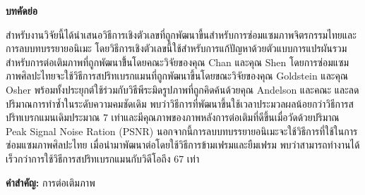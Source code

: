 \thispagestyle{empty}
\vspace{2 cm}
{\huge \bf บทคัดย่อ}

\vspace{2 cm}

\hspace{1cm} สำหรับงานวิจัยนี้ได้นำเสนอวิธีการเชิงตัวเลขที่ถูกพัฒนาขี้นสำหรับการซ่อมแซมภาพจิตรกรรมไทยและการลบบทบรรยายอนิเมะ โดยวิธีการเชิงตัวเลขนี้ใช้สำหรับการแก้ปัญหาด้วยตัวแบบการแปรผันรวมสำหรับการต่อเติมภาพที่ถูกพัฒนาขึ้้นโดยคณะวิจัยของคุณ Chan และคุณ Shen \cite{ref:rof-inpaint-chan-shen} โดยการซ่อมแซมภาพศิลปะไทยจะใช้วิธีการสปริทเบรกแมนที่ถูกพัฒนาขึ้นโดยขณะวิจัยของคุณ Goldstein และคุณ Osher \cite{ref:splitbergman-inpaint} พร้อมทั้งประยุกต์ใช้ร่วมกับวิธีพีระมิดรูปภาพที่ถูกคิดค้นด้วยคุณ Andelson และคณะ  \cite{ref:image-pyramid} และลดปริมาณการทำซ้ำในระดับความคมชัดเดิม พบว่าวิธีการที่พัฒนาขึ้นใช้เวลาประมวลผลน้อยกว่าวิธีการสปริทเบรกแมนเดิมประมาณ 7 เท่าและมีคุณภาพของภาพหลังการต่อเติมที่ดีขึ้นเมื่อวัดด้วยปริมาณ Peak Signal Noise Ration (PSNR) \cite{ref:PSNR} นอกจากนี้การลบบทบรรยายอนิเมะจะใช้วิธีการที่ใช้ในการซ่อมแซมภาพศิลปะไทย เมื่อนำมาพัฒนาต่อโดยใช้วิธีการข้ามเฟรมและยืมเฟรม พบว่าสามารถทำงานได้เร็วกว่าการใช้วิธีการสปริทเบรกแมนกับวิดีโอถึง 67 เท่า 

\vspace{1 cm}
{\bf{คำสำคัญ:}} การต่อเติมภาพ\\
\newpage
